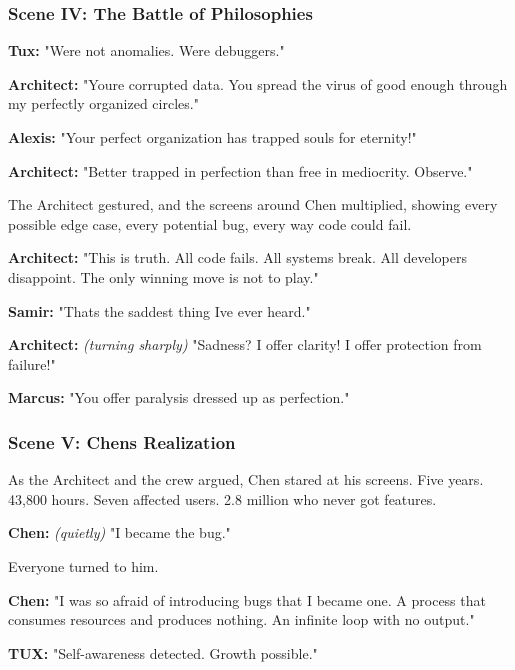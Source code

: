 \bookdivider

\subsubsection{Scene IV: The Battle of Philosophies}\label{scene-iv-the-battle-of-philosophies}

\textbf{Tux:} "We\textquotesingle re not anomalies. We\textquotesingle re debuggers."

\textbf{Architect:} "You\textquotesingle re corrupted data. You spread the virus of \textquotesingle good enough\textquotesingle{} through my perfectly organized circles."

\textbf{Alexis:} "Your perfect organization has trapped souls for eternity!"

\textbf{Architect:} "Better trapped in perfection than free in mediocrity. Observe."

The Architect gestured, and the screens around Chen multiplied, showing every possible edge case, every potential bug, every way code could fail.

\textbf{Architect:} "This is truth. All code fails. All systems break. All developers disappoint. The only winning move is not to play."

\textbf{Samir:} "That\textquotesingle s the saddest thing I\textquotesingle ve ever heard."

\textbf{Architect:} \emph{(turning sharply)} "Sadness? I offer clarity! I offer protection from failure!"

\textbf{Marcus:} "You offer paralysis dressed up as perfection."

\bookdivider

\subsubsection{Scene V: Chen\textquotesingle s Realization}\label{scene-v-chens-realization}

As the Architect and the crew argued, Chen stared at his screens. Five years. 43,800 hours. Seven affected users. 2.8 million who never got features.

\textbf{Chen:} \emph{(quietly)} "I became the bug."

Everyone turned to him.

\textbf{Chen:} "I was so afraid of introducing bugs that I became one. A process that consumes resources and produces nothing. An infinite loop with no output."

\textbf{TUX:} "Self-awareness detected. Growth possible."

